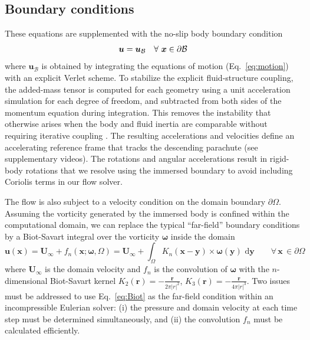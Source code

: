 \documentclass[lineno]{JFM-FLM_Au}
\begin{document}
\subsection{Boundary conditions}
These equations are supplemented with the no-slip body boundary condition
\begin{equation}
    \bm{u} = \bm{u}_\mathcal{B} \quad \forall\ \bm{x} \in \partial\cal{B}
\end{equation} 
where $\bm{u}_\mathcal{B}$ is obtained by integrating the 
equations of motion (Eq.~\ref{eq:motion}) with an explicit Verlet scheme. 
To stabilize the explicit fluid-structure coupling, the added-mass tensor is computed for each geometry using a unit acceleration simulation for each degree of freedom, and subtracted from both sides of the momentum equation during integration. This removes the instability that otherwise arises when the body and fluid inertia are comparable without requiring iterative coupling \citep{Weymouth2014ChaoticCylinder}.
The resulting accelerations and velocities define an accelerating reference frame that tracks the descending parachute (see supplementary videos).
The rotations and angular accelerations result in rigid-body rotations that we resolve using the immersed boundary to avoid including Coriolis terms in our flow solver.

The flow is also subject to a velocity condition on the domain boundary $\partial\Omega$. 
Assuming the vorticity generated by the immersed body is confined within the computational domain, we can replace the typical ``far-field'' boundary conditions by a Biot-Savart integral over the vorticity $\bm \omega$ inside the domain
\begin{equation}\label{eq:Biot}
    {\bm u}({\bm x}) = \bm U_\infty+f_n(\bm x; \bm\omega,\Omega) = \bm U_\infty+\int_\Omega K_{n}({\bm x} - \bm{y})\times \bm\omega({\bm y})\text{ d}\bm{y} \quad\quad \forall\, \bm x\, \in \partial\Omega
\end{equation}
where $\bm U_\infty$ is the domain velocity and $f_n$ is the convolution of $\bm\omega$ with the $n$-dimensional Biot-Savart kernel $K_2(\bm r)= -\frac{\bm r}{2\pi|r|^2}$, $K_3(\bm r)= -\frac{\bm r}{4\pi|r|^3}$.
Two issues must be addressed to use Eq.~\ref{eq:Biot} as the far-field condition within an incompressible Eulerian solver: (i) the pressure and domain velocity at each time step must be determined simultaneously, and (ii) the convolution $f_n$ must be calculated efficiently.
\end{document}
